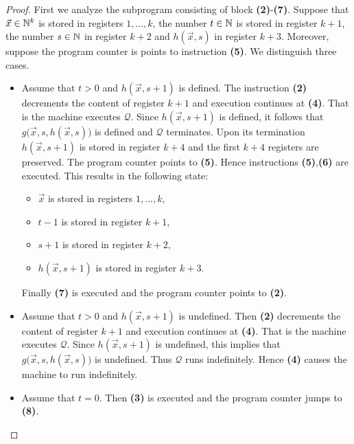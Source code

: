 \documentclass[10pt]{amsart}
\begin{document}
\begin{proof}
	First we analyze the subprogram consisting of block \textbf{(2)}-\textbf{(7)}. Suppose that $\vec{x}\in {\mathbb N}^k$ is stored in registers $1,...,k$, the number $t \in {\mathbb N}$ is stored in register $k + 1$, the number $s \in {\mathbb N}$ in register $k + 2$ and $h(\vec{x},s)$ in register $k + 3$. Moreover, suppose the program counter is points to instruction \textbf{(5)}. We distinguish three cases.
	\begin{itemize}
		\item Assume that $t > 0$ and $h(\vec{x},s + 1)$ is defined. The instruction \textbf{(2)} decrements the content of register $k + 1$ and execution continues at \textbf{(4)}. That is the machine executes $\mathcal{Q}$. Since $h(\vec{x},s + 1)$ is defined, it follows that $g\big(\vec{x},s,h\left(\vec{x},s\right)\big)$ is defined and $\mathcal{Q}$ terminates. Upon its termination $h(\vec{x},s+1)$ is stored in register $k + 4$ and the first $k + 4$ registers are preserved. The program counter points to \textbf{(5)}. Hence instructions \textbf{(5)},\textbf{(6)} are executed. This results in the following state:
		      \begin{itemize}
			      \item[] $\vec{x}$ is stored in registers $1,...,k$,
			      \item[] $t - 1$ is stored in register $k + 1$,
			      \item[] $s + 1$ is stored in register $k + 2$,
			      \item[] $h(\vec{x}, s + 1)$ is stored in register $k + 3$.
		      \end{itemize}
		      Finally \textbf{(7)} is executed and the program counter points to \textbf{(2)}.
		\item Assume that $t > 0$ and $h(\vec{x},s + 1)$ is undefined. Then \textbf{(2)} decrements the content of register $k + 1$ and execution continues at \textbf{(4)}. That is the machine executes $\mathcal{Q}$. Since $h(\vec{x},s + 1)$ is undefined, this implies that $g\big(\vec{x},s,h\left(\vec{x},s\right)\big)$ is undefined. Thus $\mathcal{Q}$ runs indefinitely. Hence \textbf{(4)} causes the machine to run indefinitely.
		\item Assume that $t = 0$. Then \textbf{(3)} is executed and the program counter jumps to \textbf{(8)}.
	\end{itemize}


\end{proof}
\end{document}
